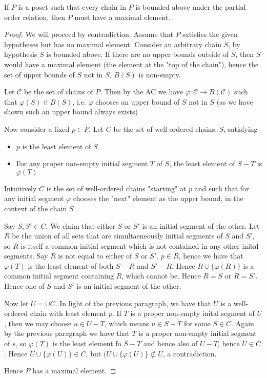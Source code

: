 \documentclass[]{article}
\begin{document}
\begin{thm}  \label{thm:zorns-lemma}
	If $P$ is a poset such that every chain in $P$ is bounded above under the partial order relation, then $P$ must have a maximal element.
\end{thm}

\begin{proof}
		We will proceed by contradiction. Assume that $P$ satisfies the given hypotheses but has no maximal element. Consider an arbitrary chain $S$, by hypothesis $S$ is bounded above. If there are no upper bounds outside of $S$, then $S$ would have a maximal element (the element at the "top of the chain"), hence the set of upper bounds of $S$ not in $S$, $B(S)$ is non-empty.

		Let $\mathcal{C}$ be the set of chains of $P$. Then by the AC we have $\varphi: \mathcal{C} \to B(\mathcal{C})$ such that $\varphi(S) \in B(S)$, i.e.  $\varphi$ chooses an upper bound of $S$ not in $S$ (as we have shown such an upper bound always exists)

		Now consider a fixed $p \in P$. Let $C$ be the set of well-ordered chains, $S$, satisfying
		\begin{itemize}
				\item $p$ is the least element of $S$ 
				\item For any proper non-empty initial segment $T$ of $S$, the least element of $S - T$ is $\varphi(T)$
		\end{itemize}

	Intuitively $C$ is the set of well-ordered chains "starting" at $p$ and such that for any initial segment $\varphi$ chooses the "next" element as the upper bound, in the context of the chain $S$

	Say $S, S' \in C$. We claim that either $S$ or $S'$ is an initial segment of the other. Let $R$ be the union of all sets that are simultaeneously initial segments of $S$ and $S'$, so $R$ is itself a common initial segment which is not contained in any other inital segments. Say $R$ is not equal to either of $S$ or $S'$.  $p \in R$, hence we have that $\varphi(T)$ is the least element of both $S - R$ and $S' - R$. Hence $R \cup \{\varphi(R)\}$ is a common initial segment containing $R$, which cannot be. Hence $R = S$ or $R = S'$. Hence one of $S$ and $S'$ is an initial segment of the other.

	Now let $U = \cup C$. In light of the previous paragraph, we have that  $U$ is a well-ordered chain with least element $p$. If $T$ is a proper non-empty inital segment of $U$, then we may choose $u \in U - T$, which means $u \in S - T$ for some $S \in C$. Again by the previous paragraph we have that $T$ is a proper non-empty initial segment of $s$, so $\varphi(T)$ is the least element fo $S - T$ and hence also of $U - T$, hence $U \in C$. Hence $U \cup \{\varphi(U)\} \in C$, but $(U \cup \{\varphi(U)\} \not \subset U$, a contradiction.

	Hence $P$ has a maximal element.
\end{proof}
\end{document}
